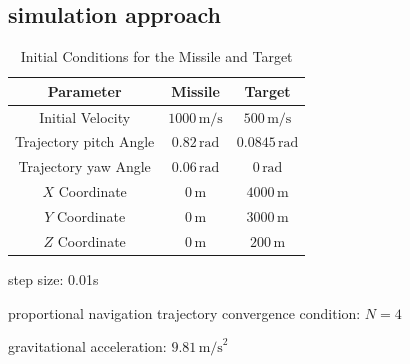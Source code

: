 \documentclass{article}
\begin{document}
\newpage

\subsection{simulation approach}
\begin{table}[h!]
  \centering
  \caption{Initial Conditions for the Missile and Target}
  \label{tab:initial_conditions}
  \begin{tabular}{|c|c|c|}
  \hline
  Parameter & Missile & Target \\
  \hline
  Initial Velocity & \(1000 \, \text{m/s}\) & \(500 \, \text{m/s}\) \\
  Trajectory pitch Angle & \(0.82 \, \text{rad}\) & \(0.0845 \, \text{rad}\) \\
  Trajectory yaw Angle & \(0.06 \, \text{rad}\) & \(0 \, \text{rad}\) \\
  \(X\) Coordinate & \(0 \, \text{m}\) & \(4000 \, \text{m}\) \\
  \(Y\) Coordinate & \(0 \, \text{m}\) & \(3000 \, \text{m}\) \\
  \(Z\) Coordinate & \(0 \, \text{m}\) & \(200 \, \text{m}\) \\
  \hline
  \end{tabular}
  \end{table}

  step size: 0.01s

  proportional navigation trajectory
  convergence condition: \( N = 4 \)

  gravitational acceleration: \( 9.81 \, \text{m/s}^2 \)

\newpage


\cite{cite-key}
  



\newpage
\end{document}

